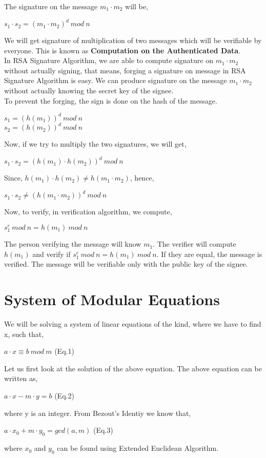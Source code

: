 \documentclass[11pt]{article}
\begin{document}
The signature on the message $m_1 \cdot m_2$ will be,
\begin{center}
    $s_1 \cdot s_2 = {(m_1 \cdot m_2)}^d \ mod \ n$
\end{center}
We will get signature of multiplication of two messages which will be verifiable by everyone. This is known as \textbf{Computation on the Authenticated Data}.\\
\newline
In RSA Signature Algorithm, we are able to compute signature on $m_1 \cdot m_2$ without actually signing, that means, forging a signature on message in RSA Signature Algorithm is easy. We can produce signature on the message $m_1 \cdot m_2$ without actually knowing the secret key of the signee.\\
\newline
To prevent the forging, the sign is done on the hash of the message.
\begin{center}
    $s_1 = {(h(m_1))}^d \ mod \ n$\\
    $s_2 = {(h(m_2))}^d \ mod \ n$
\end{center}
Now, if we try to multiply the two signatures, we will get,
\begin{center}
    $s_1 \cdot s_2 = {(h(m_1) \cdot h(m_2))}^d \ mod \ n$
\end{center}
Since, $h(m_1) \cdot h(m_2) \neq h(m_1 \cdot m_2)$, hence, 
\begin{center}
    $s_1 \cdot s_2 \neq {(h(m_1 \cdot m_2))}^d \ mod \ n$
\end{center}
Now, to verify, in verification algorithm, we compute,
\begin{center}
    $s_1^e \ mod \ n = h(m_1) \ mod \ n$
\end{center}
The person verifying the message will know $m_1$. The verifier will compute $h(m_1)$ and verify if $s_1^e \ mod \ n = h(m_1) \ mod \ n$. If they are equal, the message is verified. The message will be verifiable only with the public key of the signee.

\section{System of Modular Equations}
We will be solving a system of linear equations of the kind, where we have to find x, such that,
\begin{center}
    $a \cdot x \equiv b \ mod \ m$    (Eq.1)
\end{center}
Let us first look at the solution of the above equation. The above equation can be written as,
\begin{center}
    $a \cdot x - m \cdot y = b$     (Eq.2)
\end{center}
where y is an integer. From Bezout's Identiy we know that, 
\begin{center}
    $a \cdot x_0 + m \cdot y_0 = gcd(a, m)$    (Eq.3)
\end{center}
where $x_0$ and $y_0$ can be found using Extended Euclidean Algorithm.
\end{document}
